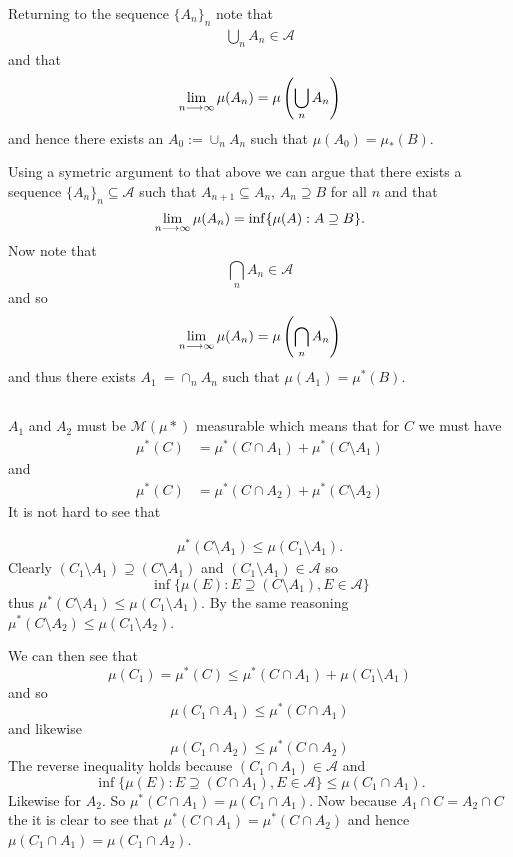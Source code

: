 \documentclass{unswmaths}
\begin{document}
Returning to the sequence $ \{ A_n \}_n $ note that 
\begin{align*}
    \bigcup_{n} A_n \in \mathcal{A} 
\end{align*} 
and that
\begin{align*}
    \lim_{n\longrightarrow\infty} \mu(A_n) = \mu\left( \bigcup_n A_n \right)    
\end{align*}
and hence there exists an $ A_0 := \cup_{n} A_n $ such that $ \mu(A_0) = \mu_{*}(B) $.

Using a symetric argument to that above we can argue that there exists a sequence
$ \{ A_n \}_n \subseteq \mathcal{A} $ such that $ A_{n+1} \subseteq A_n $, $ A_n \supseteq B $ for all $ n $ and that 
$$ \lim_{n \longrightarrow \infty} \mu(A_n) = \inf\{ \mu(A) : A \supseteq B \}. $$
Now note that
$$
    \bigcap_{n} A_n \in \mathcal{A}
$$
and so
$$
    \lim_{n \longrightarrow \infty} \mu(A_n) = \mu\left( \bigcap_n A_n \right)
$$
and thus there exists $ A_1 \:= \cap_n A_n $ such that $ \mu(A_1) = \mu^*(B) $.
\subsection{}
$ A_1 $ and $ A_2 $ must be $\mathcal{M}( \mu*) $ measurable which means that for $ C $ we must have
\begin{align*}
    \mu^*(C) &= \mu^*(C \cap A_1) + \mu^*(C \setminus A_1 ) 
\end{align*}
and
\begin{align*}
    \mu^*(C) &= \mu^*(C \cap A_2) + \mu^*(C \setminus A_2) 
\end{align*}
It is not hard to see that

\begin{align*}
   \mu^*(C \setminus A_1) \leq \mu(C_1 \setminus A_1).
\end{align*}
Clearly $ (C_1 \setminus A_1) \supseteq (C \setminus A_1) $ and $ (C_1 \setminus A_1) \in \mathcal{A} $ so
$$ \inf\{ \mu(E) : E \supseteq (C \setminus A_1), E \in \mathcal{A} \} $$
thus $ \mu^*(C \setminus A_1) \leq \mu(C_1 \setminus A_1) $. By the same reasoning $ \mu^*(C \setminus A_2) \leq \mu(C_1 \setminus A_2) $. 

We can then see that
$$
    \mu(C_1) = \mu^*(C) \leq \mu^*(C\cap A_1) + \mu(C_1 \setminus A_1 )
$$
and so
$$
    \mu(C_1 \cap A_1) \leq \mu^*(C \cap A_1)
$$
and likewise
$$
    \mu(C_1 \cap A_2) \leq \mu^*(C \cap A_2)
$$
The reverse inequality holds because $ (C_1 \cap A_1) \in \mathcal{A} $ and 
$$ \inf\{ \mu(E) : E \supseteq (C \cap A_1), E \in \mathcal{A} \} \leq \mu(C_1 \cap A_1). $$
Likewise for $ A_2 $. So $ \mu^*(C \cap A_1) = \mu( C_1 \cap A_1 )$. Now because $ A_1\cap C = A_2\cap C $ the  it is clear to see
that $ \mu^*(C \cap A_1) = \mu^*( C \cap A_2) $ and hence $ \mu(C_1 \cap A_1) = \mu(C_1 \cap A_2) $.
\end{document}
